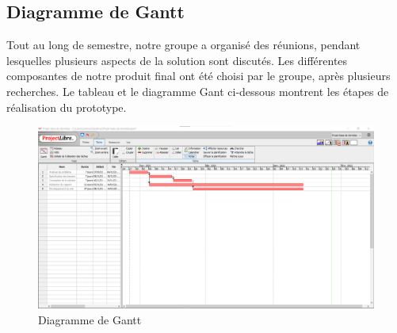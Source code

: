\subsection{Diagramme de Gantt}
Tout au long de semestre, notre groupe a organisé des réunions, pendant lesquelles plusieurs aspects de la solution sont discutés. Les différentes composantes de notre produit final ont été choisi par le groupe, après plusieurs recherches. Le tableau et le diagramme Gant ci-dessous montrent les étapes de réalisation du prototype.

\begin{figure}[ht]
    \centering
    \includegraphics[keepaspectratio=true,scale=.6, angle = -90]{Figures/gantt.png}
    \caption{Diagramme de Gantt}
    \label{fig:structure}
\end{figure}
